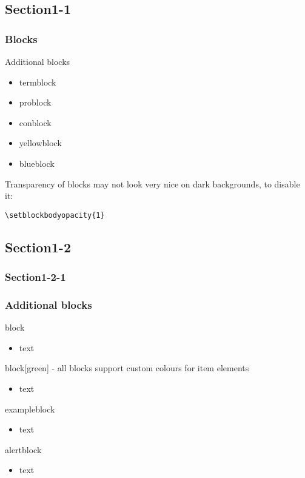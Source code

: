 \documentclass[t,compress,aspectratio=43,12p]{beamer} %
\begin{document}
\subsection{Section1-1}
\begin{frame}[fragile]
\frametitle{Blocks}
\begin{block}{Additional blocks}
\begin{itemize}
  \item termblock
  \item problock
  \item conblock
  \item yellowblock
  \item blueblock
\end{itemize}
\end{block}
Transparency of blocks may not look very nice on dark backgrounds, to disable it:
\begin{lstlisting}
\setblockbodyopacity{1}
\end{lstlisting}
\end{frame}

\subsection{Section1-2}
\subsubsection{Section1-2-1}
\begin{frame}
\frametitle{Additional blocks}
\begin{block}{block}
\begin{itemize} \item text \end{itemize}
\end{block}
\begin{block}[green]{block[green] - all blocks support custom colours for item elements}
\begin{itemize} \item text \end{itemize}
\end{block}
\begin{exampleblock}{exampleblock}
\begin{itemize} \item text \end{itemize}
\end{exampleblock}
\begin{alertblock}{alertblock}
\begin{itemize} \item text \end{itemize}
\end{alertblock}
\end{frame}
\end{document}
